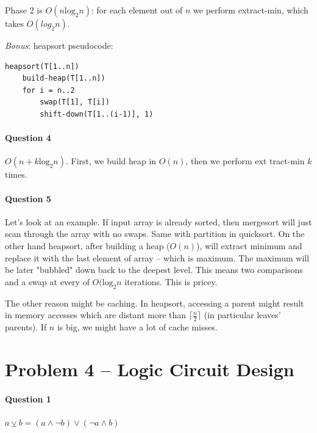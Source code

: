 Phase 2 is $O(n\text{log}_2n)$: for each element out of $n$ we perform extract-min, which takes $O(log_2n)$.

\textit{Bonus}: heapsort pseudocode:
\begin{verbatim}
heapsort(T[1..n])
    build-heap(T[1..n])
    for i = n..2
        swap(T[1], T[i])
        shift-down(T[1..(i-1)], 1)
\end{verbatim}


\paragraph{Question 4}
$O(n+k \text{log}_2 n)$.
First, we build heap in $O(n)$, then we perform ext tract-min $k$ times.


\paragraph{Question 5}
Let's look at an example.
If input array is already sorted, then mergesort will just scan through the array with no swaps.
Same with partition in quicksort.
On the other hand heapsort, after building a heap ($O(n)$), will extract minimum and replace it with the last element of array – which is maximum.
The maximum will be later "bubbled" down back to the deepest level.
This means two comparisons and a swap at every of $O(\text{log}_2 n$ iterations.
This is pricey.

The other reason might be caching.
In heapsort, accessing a parent might result in memory accesses which are distant more than $\lceil \frac{n}{2}\rceil$ (in particular leaves' parents).
If $n$ is big, we might have a lot of cache misses.


\section{Problem 4 – Logic Circuit Design}

\paragraph{Question 1}
$a \veebar b = (a \land \lnot b) \lor (\lnot a \land b) $

